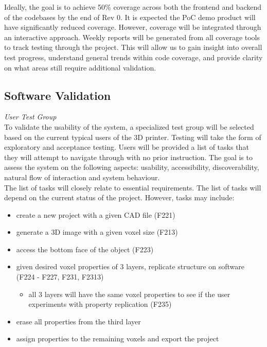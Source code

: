 \documentclass[12pt, titlepage]{article}
\begin{document}
\noindent Ideally, the goal is to achieve 50\% coverage across both the frontend and backend of the codebases by the end of Rev 0. It is expected the PoC demo product will have significantly reduced coverage. However, coverage will be integrated through an interactive approach. Weekly reports will be generated from all coverage tools to track testing through the project. This will allow us to gain insight into overall test progress, understand general trends within code coverage, and provide clarity on what areas still require additional validation.\\

\subsection{Software Validation}

\noindent\textit{User Test Group}\\
\noindent To validate the usability of the system, a specialized test group will be selected based on the current typical users of the 3D printer. Testing will take the form of exploratory and acceptance testing. Users will be provided a list of tasks that they will attempt to navigate through with no prior instruction. The goal is to assess the system on the following aspects: usability, accessibility, discoverability, natural flow of interaction and system behaviour.\\

\noindent The list of tasks will closely relate to essential requirements. The list of tasks will depend on the current status of the project. However, tasks may include:\\
\begin{itemize}
\item create a new project with a given CAD file (F221)
\item generate a 3D image with a given voxel size (F213)
\item access the bottom face of the object (F223)
\item given desired voxel properties of 3 layers, replicate structure on software (F224 - F227, F231, F2313)
\begin{itemize}
\item all 3 layers will have the same voxel properties to see if the user experiments with property replication (F235)
\end{itemize}
\item erase all properties from the third layer
\item assign properties to the remaining voxels and export the project
\end{itemize}
\end{document}
